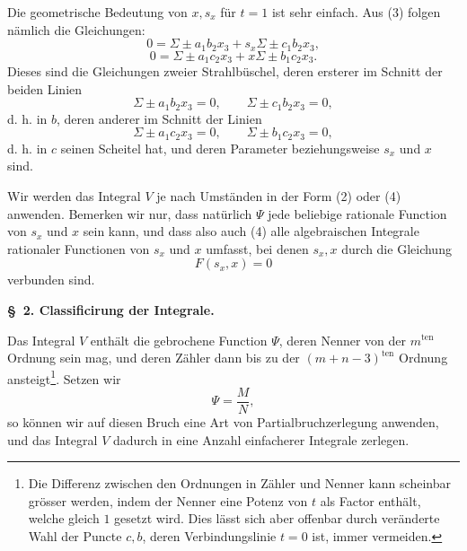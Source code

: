 \documentclass[10pt]{article}
\begin{document}
Die geometrische Bedeutung von $x,s_x$ für $t=1$ ist sehr einfach. Aus (3) folgen nämlich die Gleichungen:
\[
0=\Sigma\pm a_1b_2x_3+s_x\Sigma\pm c_1b_2x_3,
\]
\[
0=\Sigma\pm a_1c_2x_3+x\Sigma\pm b_1c_2x_3.
\]
Dieses sind die Gleichungen zweier Strahlbüschel, deren ersterer im Schnitt der beiden Linien
\[
\Sigma\pm a_1b_2x_3=0,
\qquad
\Sigma\pm c_1b_2x_3=0,
\]
d. h. in $b$, deren anderer im Schnitt der Linien
\[
\Sigma\pm a_1c_2x_3=0,
\qquad
\Sigma\pm b_1c_2x_3=0,
\]
d. h. in $c$ seinen Scheitel hat, und deren Parameter beziehungsweise $s_x$ und $x$ sind.

Wir werden das Integral $V$ je nach Umständen in der Form (2) oder (4) anwenden. Bemerken wir nur, dass natürlich $\Psi$ jede beliebige rationale Function von $s_x$ und $x$ sein kann, und dass also auch (4) alle algebraischen Integrale rationaler Functionen von $s_x$ und $x$ umfasst, bei denen $s_x,x$ durch die Gleichung
\[
F(s_x,x)=0
\]
verbunden sind.

\begin{center}
{\bfseries \S\ 2. Classificirung der Integrale.}
\end{center}

Das Integral $V$ enthält die gebrochene Function $\Psi$, deren Nenner von der $m^{\mathrm{ten}}$ Ordnung sein mag, und deren Zähler dann bis zu der $(m+n-3)^{\mathrm{ten}}$ Ordnung ansteigt\footnote{Die Differenz zwischen den Ordnungen in Zähler und Nenner kann scheinbar grösser werden, indem der Nenner eine Potenz von $t$ als Factor enthält, welche gleich $1$ gesetzt wird. Dies lässt sich aber offenbar durch veränderte Wahl der Puncte $c,b$, deren Verbindungslinie $t=0$ ist, immer vermeiden.}. Setzen wir
\[
\Psi=\frac{M}{N},
\]
so können wir auf diesen Bruch eine Art von Partialbruchzerlegung anwenden, und das Integral $V$ dadurch in eine Anzahl einfacherer Integrale zerlegen.
\end{document}
